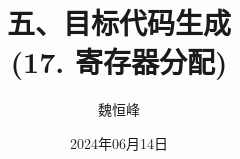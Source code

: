 \documentclass[]{beamer}
\title[目标代码生成]{五、目标代码生成 \\ (17. 寄存器分配)}
\author[魏恒峰]{\large 魏恒峰}
\institute{hfwei@nju.edu.cn}
\date{2024年06月14日}
\begin{document}
\maketitle




\thankyou{}

\end{document}
